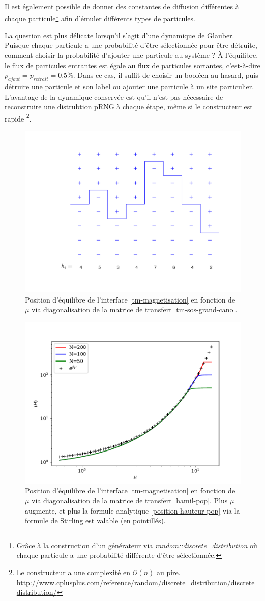 Il est également possible de donner des constantes de diffusion différentes à chaque particule\footnote{Grâce à la construction d'un générateur via \textit{random::discrete\_distribution} où chaque particule a une probabilité différente d'être sélectionnée. }  afin d'émuler différents types de particules. 

La question est plus délicate lorsqu'il s'agit d'une dynamique de Glauber. Puisque chaque particule a une probabilité d'être sélectionnée pour être détruite, comment choisir la probabilité d'ajouter une particule au système ? À l'équilibre, le flux de particules entrantes est égale au flux de particules sortantes, c'est-à-dire $p_{ajout}= p_{retrait} = 0.5\%$. Dans ce cas, il suffit de choisir un booléen au hasard, puis détruire une particule et son label ou ajouter une particule à un site particulier. L'avantage de la dynamique conservée est qu'il n'est pas nécessaire de reconstruire une distrubtion pRNG à chaque étape, même si le constructeur est rapide \footnote{Le constructeur a une complexité en $\mathcal{O}(n)$ au pire. \url{http://www.cplusplus.com/reference/random/discrete_distribution/discrete_distribution/}}.



\begin{figure}[h]
	\centering
	\includegraphics[width=0.7\linewidth]{isingtosos/figure-sos.pdf}
	\caption{Position d'équilibre de l'interface \ref{tm-magnetisation} en fonction de $\mu$ via diagonalisation de la matrice de transfert \ref{tm-sos-grand-cano}.}
	\label{figure-pop}
\end{figure}	
\begin{figure}
	\centering
	\includegraphics[width=0.5\linewidth]{isingtosos/hauteur-tm-pop.pdf}
	\caption{Position d'équilibre de l'interface \ref{tm-magnetisation} en fonction de $\mu$ via diagonalisation de la matrice de transfert \ref{hamil-pop}. Plus $\mu$ augmente, et plus la formule analytique \ref{position-hauteur-pop} via la formule de Stirling est valable (en pointillés).}
	\label{figure-pop}
\end{figure}
	
